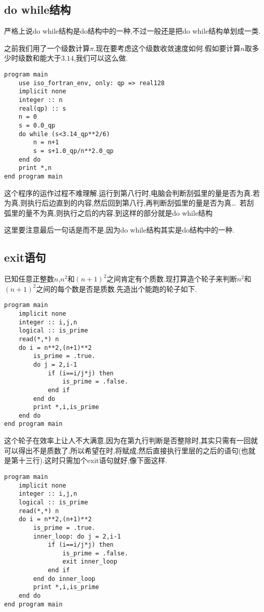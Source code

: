 \subsection{do while结构}

严格上说do while结构是do结构中的一种,不过一般还是把do while结构单划成一类.

之前我们用了一个级数计算$\pi$.现在要考虑这个级数收敛速度如何.假如要计算$n$取多少时级数和能大于$3.14$,我们可以这么做.
\begin{lstlisting}
program main
    use iso_fortran_env, only: qp => real128
    implicit none
    integer :: n
    real(qp) :: s
    n = 0
    s = 0.0_qp
    do while (s<3.14_qp**2/6)
        n = n+1
        s = s+1.0_qp/n**2.0_qp
    end do
    print *,n
end program main
\end{lstlisting}
这个程序的运作过程不难理解.运行到第八行时,电脑会判断刮弧里的量是否为真.若为真,则执行后边直到的内容,然后回到第八行,再判断刮弧里的量是否为真\dots~若刮弧里的量不为真,则执行之后的内容.到这样的部分就是do while结构

这里要注意最后一句话是而不是,因为do while结构其实是do结构中的一种.

\subsection{exit语句}\label{fortran_exit}

已知任意正整数$n$,$n^2$和$(n+1)^2$之间肯定有个质数.现打算造个轮子来判断$n^2$和$(n+1)^2$之间的每个数是否是质数.先造出个能跑的轮子如下.
\begin{lstlisting}
program main
    implicit none
    integer :: i,j,n
    logical :: is_prime
    read(*,*) n
    do i = n**2,(n+1)**2
        is_prime = .true.
        do j = 2,i-1
            if (i==i/j*j) then
                is_prime = .false.
            end if
        end do
        print *,i,is_prime
    end do
end program main
\end{lstlisting}

这个轮子在效率上让人不大满意,因为在第九行判断是否整除时,其实只需有一回就可以得出不是质数了,所以希望在时,将赋成,然后直接执行里层的之后的语句(也就是第十三行).这时只需加个exit语句就好,像下面这样.
\begin{lstlisting}
program main
    implicit none
    integer :: i,j,n
    logical :: is_prime
    read(*,*) n
    do i = n**2,(n+1)**2
        is_prime = .true.
        inner_loop: do j = 2,i-1
            if (i==i/j*j) then
                is_prime = .false.
                exit inner_loop
            end if
        end do inner_loop
        print *,i,is_prime
    end do
end program main
\end{lstlisting}

